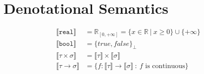 \documentclass{westhesis}
\newcommand{\R}{\mathbb{R}}
\begin{document}
\section{Denotational Semantics}
 \begin{align*}
\llbracket \texttt{real} \rrbracket &= \R_{[0, +\infty]} = \{x \in \R \ | \ x \geq 0\} \cup \{+\infty\} \\
 \llbracket \texttt{bool} \rrbracket &= {\{true, false\}}_{\perp} \\
 \llbracket \tau \times \sigma \rrbracket &= \llbracket \tau \rrbracket \times \llbracket \sigma \rrbracket  \\
 \llbracket \tau \rightarrow \sigma \rrbracket &= \{f: \llbracket \tau \rrbracket \rightarrow \llbracket \sigma \rrbracket \ : 
 \ f \text{ is continuous}\}
 \end{align*}
\end{document}
